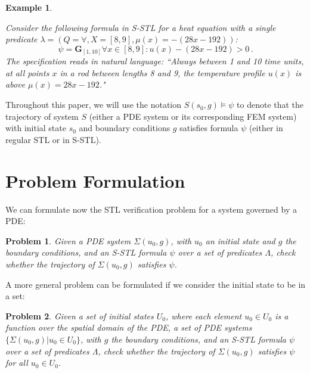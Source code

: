 \documentclass[letterpaper, 10 pt, conference]{ieeeconf/ieeeconf}
\newtheorem{problem}{Problem}
\newtheorem{example}{Example}
\newcommand{\Always}{\mathbf{G}}
\begin{document}
\begin{example}
    \label{ex:stl}

    Consider the following formula in S-STL for a heat equation with a single predicate
    $\lambda = (Q = \forall, X = [8, 9], \mu(x) = -(28x - 192))$:
%
    \begin{equation}
        \psi = \Always_{[1,10]} \forall x \in [8,9] : u(x) - (28x - 192) > 0 \,.
    \end{equation}
%
    The specification reads in natural language: ``Always between 1 and 10 time
    units, at all points $x$ in a rod between lengths 8 and 9, the temperature
    profile $u(x)$ is above $\mu(x) = 28x - 192$."

\end{example}

Throughout this paper, we will use the notation $S(s_0, g) \models \psi$ to denote
that the trajectory of system $S$ (either a PDE system or its corresponding FEM
system) with initial state $s_0$ and boundary conditions $g$ satisfies formula 
$\psi$ (either in regular STL or in S-STL).

\section{Problem Formulation}
\label{sec:problem_formulation}

We can formulate now the STL verification problem for a system governed by a
PDE:

\begin{problem}
\label{pr:stl}
    Given a PDE system $\Sigma(u_0, g)$, with $u_0$ an initial state and $g$
    the boundary conditions, and an S-STL formula $\psi$ over a set of
    predicates $\Lambda$, check whether the trajectory of $\Sigma(u_0, g)$
    satisfies $\psi$.
\end{problem}

A more general problem can be formulated if we consider the initial state to be
in a set:

\begin{problem}
\label{pr:stl_set}
    Given a set of initial states $U_0$, where each element $u_0 \in U_0$ is a
    function over the spatial domain of the PDE, a set of PDE systems
    $\{\Sigma(u_0, g) | u_0 \in U_0\}$, with $g$
    the boundary conditions, and an S-STL formula $\psi$ over a set of
    predicates $\Lambda$, check whether the trajectory of $\Sigma(u_0, g)$
    satisfies $\psi$ for all $u_0 \in U_0$.
\end{problem}
\end{document}
